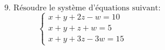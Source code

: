 \documentclass{article}
\begin{document}
\[
\text{9. Résoudre le système d'équations suivant:}
\]
\[
\begin{cases}
x + y + 2z - w = 10 \\
x + y + z + w = 5 \\
x + y + 3z - 3w = 15
\end{cases}
\]
\end{document}
